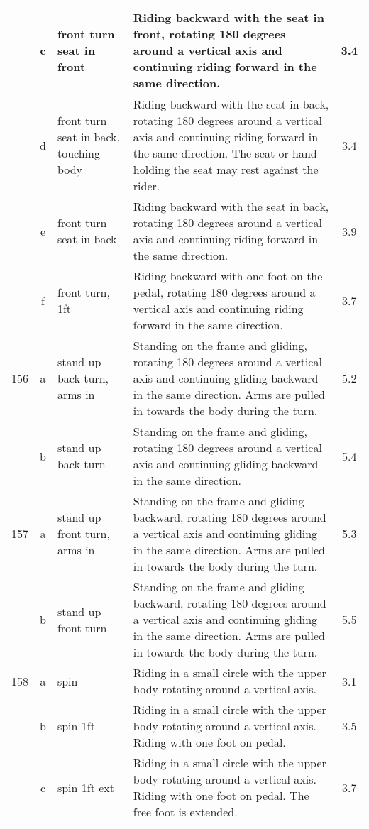 \begin{longtable}{|r|c|p{4cm}|p{8cm}|c|}
\hline
  & c & front turn seat in front  & Riding backward with the seat in front, rotating 180 degrees around a vertical axis and continuing riding forward in the same direction.  & 3.4 \\ 
\hline
  & d & front turn seat in back, touching body  & Riding backward with the seat in back, rotating 180 degrees around a vertical axis and continuing riding forward in the same direction. The seat or hand holding the seat may rest against the rider. & 3.4 \\ 
\hline
  & e & front turn seat in back & Riding backward with the seat in back, rotating 180 degrees around a vertical axis and continuing riding forward in the same direction. & 3.9 \\ 
\hline
  & f & front turn, 1ft & Riding backward with one foot on the pedal, rotating 180 degrees around a vertical axis and continuing riding forward in the same direction.  & 3.7 \\ 
\hline
156 & a & stand up back turn, arms in & Standing on the frame and gliding, rotating 180 degrees around a vertical axis and continuing gliding backward in the same direction. Arms are pulled in towards the body during the turn.  & 5.2 \\ 
\hline
  & b & stand up back turn  & Standing on the frame and gliding, rotating 180 degrees around a vertical axis and continuing gliding backward in the same direction. & 5.4 \\ 
\hline
157 & a & stand up front turn, arms in  & Standing on the frame and gliding backward, rotating 180 degrees around a vertical axis and continuing gliding in the same direction. Arms are pulled in towards the body during the turn.  & 5.3 \\ 
\hline
  & b & stand up front turn & Standing on the frame and gliding backward, rotating 180 degrees around a vertical axis and continuing gliding in the same direction. Arms are pulled in towards the body during the turn.  & 5.5 \\ 
\hline
158 & a & spin  & Riding in a small circle with the upper body rotating around a vertical axis. & 3.1 \\ 
\hline
  & b & spin 1ft  & Riding in a small circle with the upper body rotating around a vertical axis. Riding with one foot on pedal.  & 3.5 \\ 
\hline
  & c & spin 1ft ext  & Riding in a small circle with the upper body rotating around a vertical axis. Riding with one foot on pedal. The free foot is extended. & 3.7 \\ 

\end{longtable}
